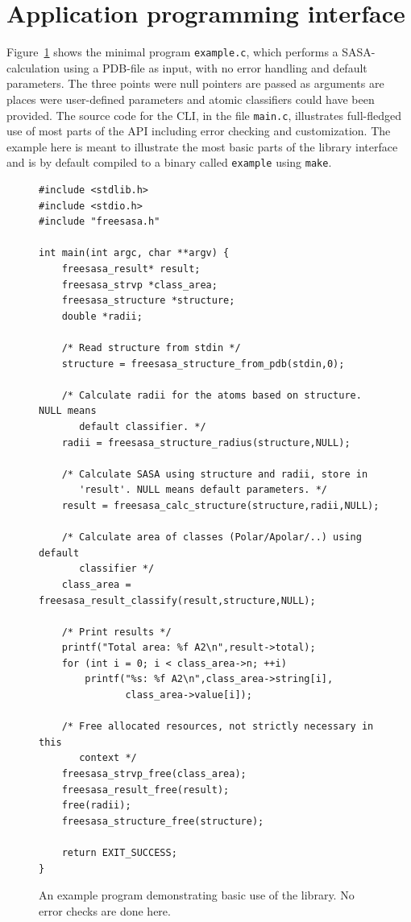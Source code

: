 \documentclass[a4paper,11pt]{article}
\begin{document}
\section{Application programming interface}\label{sec:api}

Figure~\ref{fig:example_c} shows the minimal program \verb|example.c|,
which performs a SASA-calculation using a PDB-file as input, with no
error handling and default parameters. The three points were null
pointers are passed as arguments are places were user-defined
parameters and atomic classifiers could have been provided. The source
code for the CLI, in the file \verb|main.c|, illustrates full-fledged
use of most parts of the API including error checking and
customization. The example here is meant to illustrate the most basic
parts of the library interface and is by default compiled to a binary
called \verb|example| using \verb|make|.

\begin{figure}
  \begin{Verbatim}[frame=single,fontsize=\small,framesep=5mm]
#include <stdlib.h>
#include <stdio.h>
#include "freesasa.h"

int main(int argc, char **argv) {
    freesasa_result* result;
    freesasa_strvp *class_area;
    freesasa_structure *structure;
    double *radii;

    /* Read structure from stdin */
    structure = freesasa_structure_from_pdb(stdin,0);

    /* Calculate radii for the atoms based on structure.  NULL means
       default classifier. */
    radii = freesasa_structure_radius(structure,NULL);

    /* Calculate SASA using structure and radii, store in
       'result'. NULL means default parameters. */
    result = freesasa_calc_structure(structure,radii,NULL);
    
    /* Calculate area of classes (Polar/Apolar/..) using default
       classifier */
    class_area = freesasa_result_classify(result,structure,NULL);

    /* Print results */
    printf("Total area: %f A2\n",result->total);
    for (int i = 0; i < class_area->n; ++i)
        printf("%s: %f A2\n",class_area->string[i],
               class_area->value[i]);

    /* Free allocated resources, not strictly necessary in this
       context */
    freesasa_strvp_free(class_area);
    freesasa_result_free(result);
    free(radii);
    freesasa_structure_free(structure);

    return EXIT_SUCCESS;
}

  \end{Verbatim}
  \caption{An example program demonstrating basic use of the
    library. No error checks are done here. \label{fig:example_c}}
\end{figure}
\end{document}
